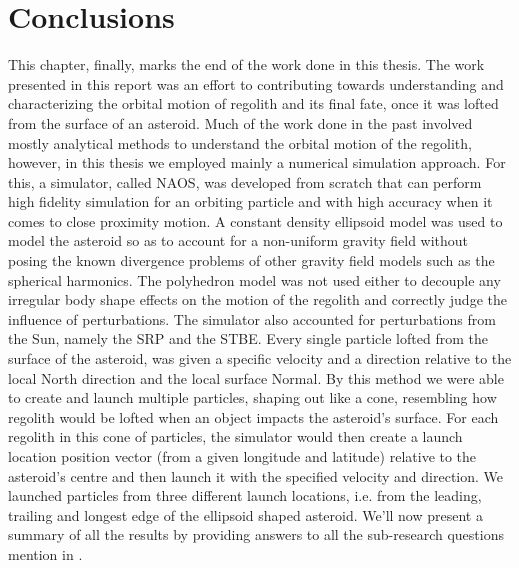 \chapter{Conclusions}
\label{chap:conclusions}
\graphicspath{{Conclusions/}}

This chapter, finally, marks the end of the work done in this thesis. The work presented in this report was an effort to contributing towards understanding and characterizing the orbital motion of regolith and its final fate, once it was lofted from the surface of an asteroid. Much of the work done in the past involved mostly analytical methods to understand the orbital motion of the regolith, however, in this thesis we employed mainly a numerical simulation approach. For this, a simulator, called \gls{NAOS}, was developed from scratch that can perform high fidelity simulation for an orbiting particle and with high accuracy when it comes to close proximity motion.
%
\newline\newline
%
A constant density ellipsoid model was used to model the asteroid so as to account for a non-uniform gravity field without posing the known divergence problems of other gravity field models such as the spherical harmonics. The polyhedron model was not used either to decouple any irregular body shape effects on the motion of the regolith and correctly judge the influence of perturbations. The simulator also accounted for perturbations from the Sun, namely the \gls{SRP} and the \gls{STBE}. Every single particle lofted from the surface of the asteroid, was given a specific velocity and a direction relative to the local North direction and the local surface Normal. By this method we were able to create and launch multiple particles, shaping out like a cone, resembling how regolith would be lofted when an object impacts the asteroid's surface. For each regolith in this cone of particles, the simulator would then create a launch location position vector (from a given longitude and latitude) relative to the asteroid's centre and then launch it with the specified velocity and direction. We launched particles from three different launch locations, i.e. from the leading, trailing and longest edge of the ellipsoid shaped asteroid.
%
\newline\newline
%
We'll now present a summary of all the results by providing answers to all the sub-research questions mention in .
